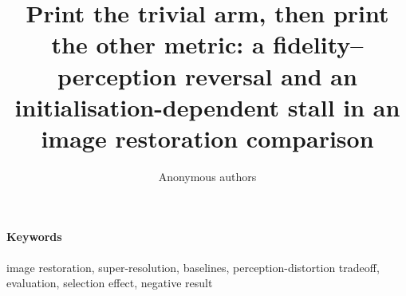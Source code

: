 \documentclass[11pt]{article}
\title{Print the trivial arm, then print the other metric: a
fidelity--perception reversal and an initialisation-dependent stall in an
image restoration comparison}
\author{Anonymous authors}
\date{}
\begin{document}
\maketitle

\begin{abstract}

\end{abstract}

\paragraph{Keywords} image restoration, super-resolution, baselines, perception-distortion tradeoff, evaluation, selection effect, negative result





\end{document}
